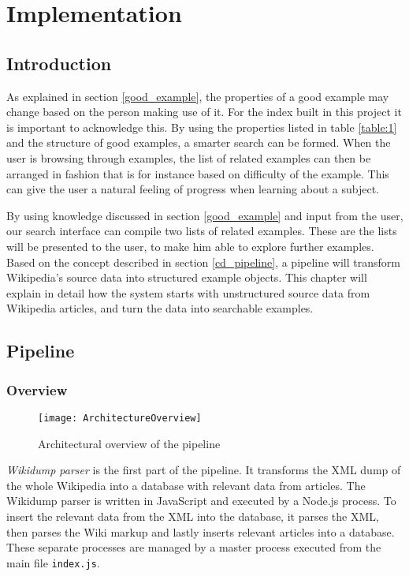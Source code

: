 
\chapter{Implementation}\label{cap_4}

\section{Introduction}

As explained in section \ref{good_example}, the properties of a good example may change based on the person making use of it. For the index built in this project it is important to acknowledge this. By using the properties listed in table \ref{table:1} and the structure of good examples, a smarter search can be formed. When the user is browsing through examples, the list of related examples can then be arranged in fashion that is for instance based on difficulty of the example. This can give the user a natural feeling of progress when learning about a subject.

By using knowledge discussed in section \ref{good_example} and input from the user, our search interface can compile two lists of related examples. These are the lists will be presented to the user, to make him able to explore further examples. Based on the concept described in section \ref{cd_pipeline}, a pipeline will transform Wikipedia's source data into structured example objects. This chapter will explain in detail how the system starts with unstructured source data from Wikipedia articles, and turn the data into searchable examples.

\section{Pipeline}

\subsection{Overview}

\begin{figure}[h]
\caption{Architectural overview of the pipeline}
\texttt{[image: ArchitectureOverview]}
\label{fig:pipeline_arch}
\end{figure}


\textit{Wikidump parser} is the first part of the pipeline. It transforms the XML dump of the whole Wikipedia into a database with relevant data from articles. The Wikidump parser is written in JavaScript and executed by a Node.js process. To insert the relevant data from the XML into the database, it parses the XML, then parses the Wiki markup and lastly inserts relevant articles into a database. These separate processes are managed by a master process executed from the main file \texttt{index.js}.

